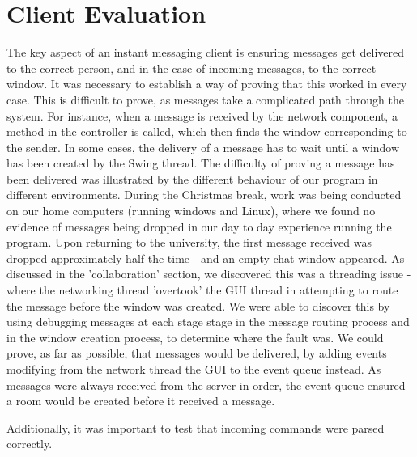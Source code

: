 \section{Client Evaluation}
\label{client_eval}

The key aspect of an instant messaging client is ensuring messages get delivered to the correct person, and in the case of incoming messages, to the correct window. It was necessary to establish a way of proving that this worked in every case. This is difficult to prove, as messages take a complicated path through the system. For instance, when a message is received by the network component, a method in the controller is called, which then finds the window corresponding to the sender. In some cases, the delivery of a message has to wait until a window has been created by the Swing thread. The difficulty of proving a message has been delivered was illustrated by the different behaviour of our program in different environments. During the Christmas break, work was being conducted on our home computers (running windows and Linux), where we found no evidence of messages being dropped in our day to day experience running the program. Upon returning to the university, the first message received was dropped approximately half the time - and an empty chat window appeared. As discussed in the 'collaboration' section, we discovered this was a threading issue - where the networking thread 'overtook' the GUI thread in attempting to route the message before the window was created. We were able to discover this by using debugging messages at each stage stage in the message routing process and in the window creation process, to determine where the fault was. We could prove, as far as possible, that messages would be delivered, by adding events modifying from the network thread the GUI to the event queue instead. As messages were always received from the server in order, the event queue ensured a room would be created before it received a message. 

Additionally, it was important to test that incoming commands were parsed correctly. 



